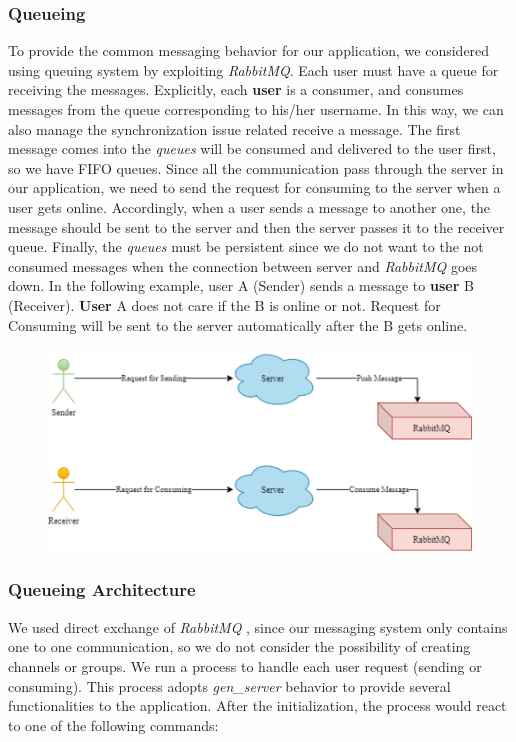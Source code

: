 \subsubsection{Queueing}
To provide the common messaging behavior for our application, we considered using queuing system by exploiting \textit{RabbitMQ}. Each user must have a queue for receiving the messages. Explicitly, each \textbf{user}  is a consumer, and consumes messages from the queue corresponding to his/her username. In this way, we can also manage the synchronization issue related receive a message. The first message comes into the \textit{queues} will be consumed and delivered to the user first, so we have FIFO queues. Since all the communication pass through the server in our application, we need to send the request for consuming to the server when a user gets online. Accordingly, when a user sends a message to another one, the message should be sent to the server and then the server passes it to the receiver queue. Finally, the \textit{queues} must be persistent since we do not want to the not consumed messages when the connection between server and \textit{RabbitMQ} goes down. 
In the following example, user A (Sender) sends a message to \textbf{user} B (Receiver). \textbf{User}  A does not care if the B is online or not.  Request for Consuming will be sent to the server automatically after the B gets online. 

\begin{figure}[H]
	\centering
	\includegraphics[width=\textwidth]{img/rabbitMQ.png}  
\end{figure}

\subsubsection{Queueing Architecture}
We used direct exchange of \textit{RabbitMQ} , since our messaging system only contains one to one communication, so we do not consider the possibility of creating channels or groups.
We run a process to handle each user request (sending or consuming). This process adopts \textit{gen\_server} behavior to provide several functionalities to the application. After the initialization, the process would react to one of the following commands:

